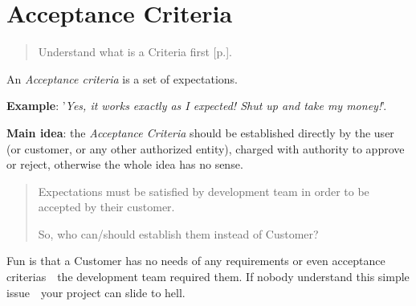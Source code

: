 \section{Acceptance Criteria}
\label{sec:Acceptance Criteria}

\begin{quote}
Understand what is a Criteria first [p.\pageref{sec:Criteria}].
\end{quote} 

An \emph{Acceptance criteria} is a set of expectations.

\textbf{Example}: '\textit{Yes, it works exactly as I expected! Shut up and take my money!}'.

\textbf{Main idea}: the \emph{Acceptance Criteria} should be established directly by the user (or customer, or any other authorized entity), charged with authority to approve or reject, otherwise the whole idea has no sense. \begin{quote}
Expectations must be satisfied by development team in order to be accepted by their customer. 

So, who can/should establish them instead of Customer?\end{quote}

Fun is that a Customer has no needs of any requirements or even acceptance criterias~\textemdash~the development team required them. If nobody understand this simple issue~\textemdash~your project can slide to hell.
